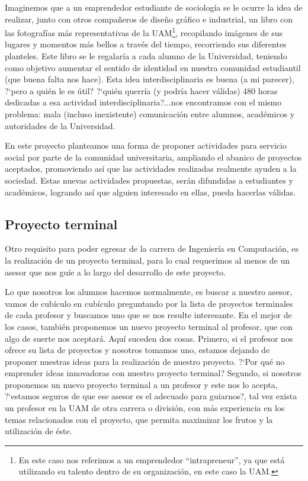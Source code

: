 \documentclass[11pt,letterpaper,titlepage]{article}
\begin{document}
Imaginemos que a un emprendedor estudiante de sociolog\'ia se le ocurre la idea de realizar, junto con otros compa\~neros de dise\~no gr\'afico e industrial, un libro con las fotograf\'ias m\'as representativas de la UAM\footnote{En este caso nos referimos a un emprendedor ``intrapreneur'', ya que est\'a utilizando su talento dentro de su organizaci\'on, en este caso la UAM.\cite{emprendedurismo}}, recopilando im\'agenes de sus lugares y momentos m\'as bellos a trav\'es del tiempo, recorriendo sus diferentes planteles. Este libro se le regalar\'ia a cada alumno de la Universidad, teniendo como objetivo aumentar el sentido de identidad en nuestra comunidad estudiantil (que buena falta nos hace). Esta idea interdisciplinaria es buena (a mi parecer), ?`pero a qui\'en le es \'util? ?`qui\'en querr\'ia (y podr\'ia hacer v\'alidas) 480 horas dedicadas a esa actividad interdisciplinaria?...nos encontramos con el mismo problema: mala (incluso inexistente) comunicaci\'on entre alumnos, acad\'emicos y autoridades de la Universidad.

En este proyecto planteamos una forma de proponer actividades para servicio social por parte de la comunidad universitaria, ampliando el abanico de proyectos aceptados, promoviendo as\'i que las actividades realizadas realmente ayuden a la sociedad. Estas nuevas actividades propuestas, ser\'an difundidas a estudiantes y acad\'emicos, logrando as\'i que alguien interesado en ellas, pueda hacerlas v\'alidas.


\subsection{Proyecto terminal}
Otro requisito para poder egresar de la carrera de Ingenier\'ia en Computaci\'on, es la realizaci\'on de un proyecto terminal, para lo cual requerimos al menos de un asesor que nos gu\'ie a lo largo del desarrollo de este proyecto.

Lo que nosotros los alumnos hacemos normalmente, es buscar a nuestro asesor, vamos de cub\'iculo en cub\'iculo preguntando por la lista de proyectos terminales de cada profesor y buscamos uno que se nos resulte interesante. En el mejor de los casos, tambi\'en proponemos un nuevo proyecto terminal al profesor, que con algo de suerte nos aceptar\'a. Aqu\'i suceden dos cosas. Primero, si el profesor nos ofrece su lista de proyectos y nosotros tomamos uno, estamos dejando de proponer nuestras ideas para la realizaci\'on de nuestro proyecto. ?`Por qu\'e no emprender ideas innovadoras con nuestro proyecto terminal? Segundo, si nosotros proponemos un nuevo proyecto terminal a un profesor y este nos lo acepta, ?`estamos seguros de que ese asesor es el adecuado para guiarnos?, tal vez exista un profesor en la UAM de otra carrera o divisi\'on, con m\'as experiencia en los temas relacionados con el proyecto, que permita maximizar los frutos y la utilizaci\'on de \'este.
\end{document}
